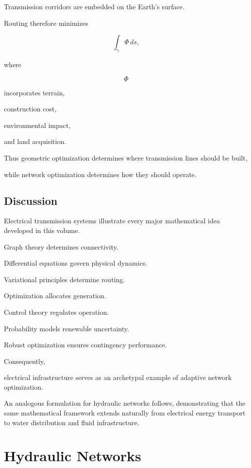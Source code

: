 \documentclass[11pt,fleqn]{book}
\numberwithin{equation}{chapter}
\theoremstyle{plain}
\theoremstyle{definition}
\theoremstyle{remark}
\begin{document}
Transmission corridors are embedded on the Earth's surface.

Routing therefore minimizes

\[
\int_\gamma
\Phi
\,ds,
\]

where

\[
\Phi
\]

incorporates terrain,

construction cost,

environmental impact,

and land acquisition.

Thus geometric optimization determines where transmission lines should
be built,

while network optimization determines how they should operate.


\section{Discussion}

Electrical transmission systems illustrate every major mathematical idea
developed in this volume.

Graph theory determines connectivity.

Differential equations govern physical dynamics.

Variational principles determine routing.

Optimization allocates generation.

Control theory regulates operation.

Probability models renewable uncertainty.

Robust optimization ensures contingency performance.

Consequently,

electrical infrastructure serves as an archetypal example of adaptive
network optimization.

An analogous formulation for hydraulic
networks follows, demonstrating that the same mathematical framework extends
naturally from electrical energy transport to water distribution and
fluid infrastructure.

\chapter{Hydraulic Networks}
\end{document}
